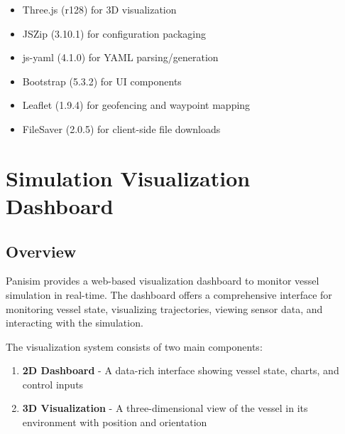 \documentclass[
  letterpaper,
  DIV=11,
  numbers=noendperiod]{scrreprt}
\providecommand{\tightlist}{%
  \setlength{\itemsep}{0pt}\setlength{\parskip}{0pt}}\usepackage{longtable,booktabs,array}
\begin{document}
\begin{enumerate}
\begin{itemize}
    \begin{itemize}
    \tightlist
    \item
      Three.js (r128) for 3D visualization
    \item
      JSZip (3.10.1) for configuration packaging
    \item
      js-yaml (4.1.0) for YAML parsing/generation
    \item
      Bootstrap (5.3.2) for UI components
    \item
      Leaflet (1.9.4) for geofencing and waypoint mapping
    \item
      FileSaver (2.0.5) for client-side file downloads
    \end{itemize}
  \end{itemize}
\end{enumerate}


\chapter*{Simulation Visualization
Dashboard}\label{simulation-visualization-dashboard}


\section*{Overview}\label{overview-7}


Panisim provides a web-based visualization dashboard to monitor vessel
simulation in real-time. The dashboard offers a comprehensive interface
for monitoring vessel state, visualizing trajectories, viewing sensor
data, and interacting with the simulation.

The visualization system consists of two main components:

\begin{enumerate}
\def\labelenumi{\arabic{enumi}.}
\tightlist
\item
  \textbf{2D Dashboard} - A data-rich interface showing vessel state,
  charts, and control inputs
\item
  \textbf{3D Visualization} - A three-dimensional view of the vessel in
  its environment with position and orientation
\end{enumerate}
\end{document}
